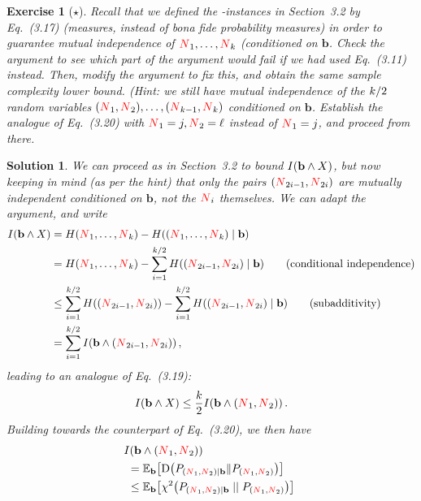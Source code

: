 \documentclass[biber]{nowfnt} %
\newtheorem{question}{Exercise}[chapter]
\newtheorem{solution}{Solution}[chapter]
\newcommand{\occur}{\textcolor{red}{N}}
\newcommand{\occur}{N}
\begin{document}
\begin{question}[$\star$]\label{exo:paninski:mi:lb}
Recall that we defined the \no-instances in Section~3.2 by Eq.~(3.17) (measures, instead of \emph{bona fide} probability measures) in order to guarantee mutual independence of $\occur_1,\dots,\occur_\ab$ (conditioned on $\mathbf{b}$. Check the argument to see which part of the argument would fail if we had used Eq.~(3.11) instead. Then, modify the argument to fix this, and obtain the same sample complexity lower bound. \textit{(Hint: we still have mutual independence of the $k/2$ random variables $(\occur_1, \occur_2),\dots,(\occur_{\ab-1}, \occur_\ab)$ conditioned on $\mathbf{b}$. Establish the analogue of Eq.~(3.20) with $\occur_1=j,\occur_2=\ell$ instead of $\occur_1=j$, and proceed from there.}
\end{question}
\begin{solution}
We can proceed as in Section~3.2 to bound $\mutualinfo{\mathbf{b}}{X}$, but now keeping in mind (as per the hint) that only the pairs $(\occur_{2i-1}, \occur_{2i})$ are mutually independent conditioned on $\mathbf{b}$, not the $\occur_i$ themselves. We can adapt the argument, and write
\begin{align*}
\mutualinfo{\mathbf{b}}{X} 
&= \entropy{\occur_1,\dots,\occur_\ab} - \entropy{(\occur_1,\dots,\occur_\ab) \mid \mathbf{b}}  \\
&= \entropy{\occur_1,\dots,\occur_\ab} - \sum_{i=1}^{\ab/2} \entropy{(\occur_{2i-1}, \occur_{2i}) \mid \mathbf{b}}  \tag{conditional independence}\\
&\leq \sum_{i=1}^{\ab/2} \entropy{(\occur_{2i-1}, \occur_{2i})} - \sum_{i=1}^{\ab/2} \entropy{(\occur_{2i-1}, \occur_{2i}) \mid \mathbf{b}}  \tag{subadditivity}\\
&= \sum_{i=1}^{\ab/2}\mutualinfo{\mathbf{b}}{(\occur_{2i-1}, \occur_{2i})}\,,
\end{align*}
leading to an analogue of Eq.~(3.19):
\begin{equation}
	\mutualinfo{\mathbf{b}}{X} \leq \frac{\ab}{2} \mutualinfo{\mathbf{b}}{(\occur_{1}, \occur_{2})}\,.
\end{equation}
Building towards the counterpart of Eq.~(3.20), we then have
\begin{align*}
	&\!\!\mutualinfo{\mathbf{b}}{(\occur_{1}, \occur_{2})} \\
	&= \bE{\mathbf{b}}{\kldiv{P_{(\occur_1,\occur_2)\mid \mathbf{b}}}{P_{(\occur_1,\occur_2)}}} \notag\\
	&\leq \bE{\mathbf{b}}{\chisquare{P_{(\occur_1,\occur_2)\mid \mathbf{b}}}{P_{(\occur_1,\occur_2)}}} \notag\\

\end{align*}
\end{solution}
\end{document}
